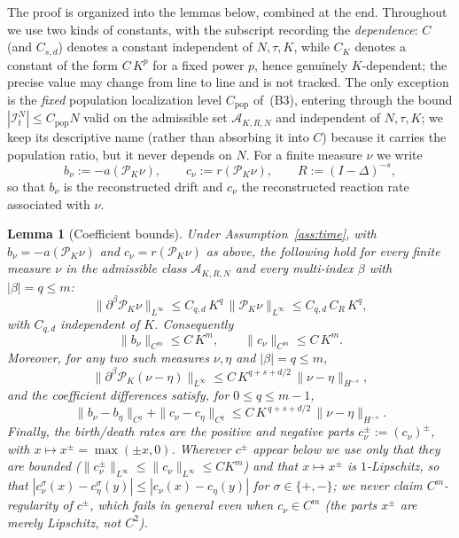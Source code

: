 \documentclass[a4paper,fleqn]{cas-sc}
\newtheorem{lemma}[theorem]{Lemma}
\theoremstyle{definition}
\theoremstyle{remark}
\begin{document}
The proof is organized into the lemmas below, combined at the end. Throughout we use
two kinds of constants, with the subscript recording the \emph{dependence}: $C$ (and
$C_{s,d}$) denotes a constant independent of $N,\tau,K$, while $C_K$ denotes a constant
of the form $C\,K^{p}$ for a fixed power $p$, hence genuinely $K$-dependent; the precise
value may change from line to line and is not tracked. The only exception is the
\emph{fixed} population localization level $C_{\mathrm{pop}}$ of~(B3), entering through the bound
$|\mathcal I^N_t|\le C_{\mathrm{pop}}N$ valid on the admissible set $\mathcal A_{K,R,N}$ and
independent of $N,\tau,K$; we keep its descriptive name (rather than absorbing it into $C$) because
it carries the population ratio, but it never depends on $N$. For a finite measure $\nu$ we write
\[
b_\nu:=-a(\mathcal P_K\nu),\qquad
c_\nu:=r(\mathcal P_K\nu),\qquad
R:=(I-\Delta)^{-s},
\]
so that $b_\nu$ is the reconstructed drift and $c_\nu$ the reconstructed reaction
rate associated with $\nu$.

\begin{lemma}[Coefficient bounds]\label{lem:coeff}
Under Assumption~\ref{ass:time}, with $b_\nu=-a(\mathcal P_K\nu)$ and
$c_\nu=r(\mathcal P_K\nu)$ as above, the following hold for every finite measure
$\nu$ in the admissible class $\mathcal A_{K,R,N}$ and every multi-index $\beta$ with
$|\beta|=q\le m$:
\begin{equation}\label{equ:Bernstein_inequality}
\|\partial^\beta\mathcal P_K\nu\|_{L^\infty}
\le C_{q,d}\,K^{q}\,\|\mathcal P_K\nu\|_{L^\infty}
\le C_{q,d}\,C_R\,K^{q},
\end{equation}
with $C_{q,d}$ independent of $K$. Consequently
\begin{equation}\label{eq:Bb}
\|b_\nu\|_{C^m}\le C\,K^{m},\qquad \|c_\nu\|_{C^m}\le C\,K^{m}.
\end{equation}
Moreover, for any two such measures $\nu,\eta$ and $|\beta|=q\le m$,
\begin{equation}\label{eq:proj-diff}
\|\partial^\beta\mathcal P_K(\nu-\eta)\|_{L^\infty}
\le C\,K^{q+s+d/2}\,\|\nu-\eta\|_{H^{-s}},
\end{equation}
and the coefficient differences satisfy, for $0\le q\le m-1$,
\begin{equation}\label{eq:Blip}
\|b_\nu-b_\eta\|_{C^{q}}+\|c_\nu-c_\eta\|_{C^{q}}
\le C\,K^{\,q+s+d/2}\,\|\nu-\eta\|_{H^{-s}}.
\end{equation}
Finally, the birth/death rates are the positive and negative parts
$c^\pm_\nu:=(c_\nu)^\pm$, with $x\mapsto x^\pm=\max(\pm x,0)$. Wherever $c^\pm$ appear
below we use \emph{only} that they are bounded ($\|c^\pm_\nu\|_{L^\infty}\le\|c_\nu\|_{L^\infty}\le CK^{m}$)
and that $x\mapsto x^\pm$ is $1$-Lipschitz, so that
$|c^\sigma_\nu(x)-c^\sigma_\eta(y)|\le|c_\nu(x)-c_\eta(y)|$ for $\sigma\in\{+,-\}$;
we never claim $C^m$-regularity of $c^\pm$, which fails in general even when
$c_\nu\in C^m$ (the parts $x^\pm$ are merely Lipschitz, not $C^2$).
\end{lemma}
\end{document}
